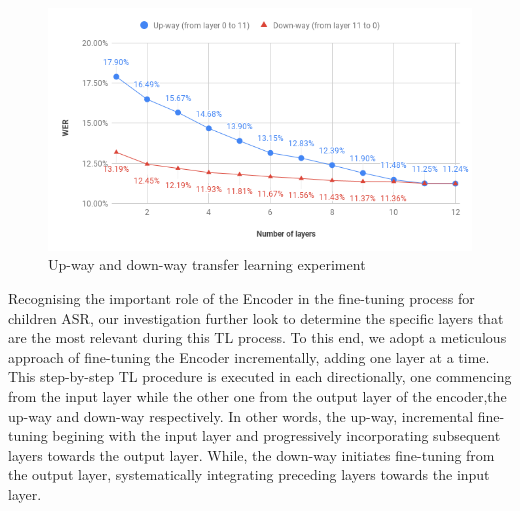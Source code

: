 \begin{figure}
    \begin{center}
        \includegraphics[scale=0.7]{imgs/layerTL.png}
    \end{center}
    \caption{Up-way and down-way transfer learning experiment}
\end{figure}
Recognising the important role of the Encoder in the fine-tuning process for children ASR, our investigation further look to determine the specific layers that are the most relevant during this TL process. To this end, we adopt a meticulous approach of fine-tuning the Encoder incrementally, adding one layer at a time. This step-by-step TL procedure is executed in each directionally, one commencing from the input layer while the other one from the output layer of the encoder,the up-way and down-way respectively. In other words, the up-way, incremental fine-tuning begining with the input layer and progressively incorporating subsequent layers towards the output layer. While, the down-way initiates fine-tuning from the output layer, systematically integrating preceding layers towards the input layer.
